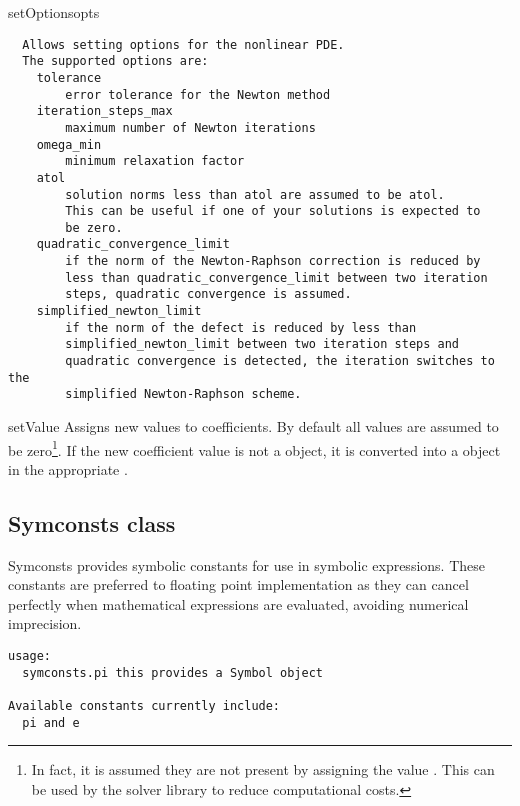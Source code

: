 \begin{methoddesc}[NonlinearPDE]{setOptions}{opts}
\begin{verbatim}
  Allows setting options for the nonlinear PDE.
  The supported options are:
    tolerance
        error tolerance for the Newton method
    iteration_steps_max
        maximum number of Newton iterations
    omega_min
        minimum relaxation factor
    atol
        solution norms less than atol are assumed to be atol.
        This can be useful if one of your solutions is expected to
        be zero.
    quadratic_convergence_limit
        if the norm of the Newton-Raphson correction is reduced by
        less than quadratic_convergence_limit between two iteration
        steps, quadratic convergence is assumed.
    simplified_newton_limit
        if the norm of the defect is reduced by less than
        simplified_newton_limit between two iteration steps and
        quadratic convergence is detected, the iteration switches to the
        simplified Newton-Raphson scheme.
\end{verbatim}

\end{methoddesc}
\begin{methoddesc}[NonlinearPDE]{setValue}{
}
Assigns new values to coefficients. By default all values are assumed to be
zero\footnote{In fact, it is assumed they are not present by assigning the
value . This can be used by the solver library to reduce
computational costs.}.
If the new coefficient value is not a \Data object, it is converted into a
\Data object in the appropriate \FunctionSpace.
\end{methoddesc}

\subsection{Symconsts class}
Symconsts provides symbolic constants for use in symbolic expressions. These constants are preferred to floating point implementation as they can cancel perfectly when mathematical expressions are evaluated, avoiding numerical imprecision. 
\begin{verbatim}
usage:
  symconsts.pi this provides a Symbol object

Available constants currently include:
  pi and e 
\end{verbatim}
